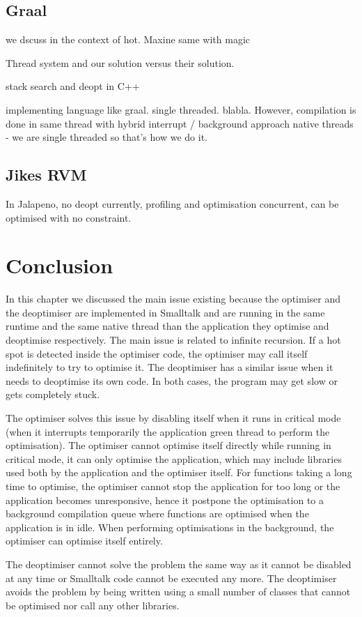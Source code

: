 \documentclass[a4paper,12pt,twoside]{../includes/ThesisStyle}
\begin{document}
\subsection{Graal}

we dscuss in the context of hot. Maxine same with magic

Thread system and our solution versus their solution.

stack search and deopt in C++

implementing language like graal. single threaded. blabla.
However, compilation is done in same thread with hybrid interrupt / background approach
native threads - we are single threaded so that's how we do it.

\subsection{Jikes RVM}

In Jalapeno, no deopt currently, profiling and optimisation concurrent, can be optimised with no constraint. 


\section{Conclusion}

In this chapter we discussed the main issue existing because the optimiser and the deoptimiser are implemented in Smalltalk and are running in the same runtime and the same native thread than the application they optimise and deoptimise respectively. The main issue is related to infinite recursion. If a hot spot is detected inside the optimiser code, the optimiser may call itself indefinitely to try to optimise it. The deoptimiser has a similar issue when it needs to deoptimise its own code. In both cases, the program may get slow or gets completely stuck.

The optimiser solves this issue by disabling itself when it runs in critical mode (when it interrupts temporarily the application green thread to perform the optimisation). The optimiser cannot optimise itself directly while running in critical mode, it can only optimise the  application, which may include libraries used both by the application and the optimiser itself. For functions taking a long time to optimise, the optimiser cannot stop the application for too long or the application becomes unresponsive, hence it postpone the optimisation to a background compilation queue where functions are optimised when the application is in idle. When performing optimisations in the background, the optimiser can optimise itself entirely.

The deoptimiser cannot solve the problem the same way as it cannot be disabled at any time or Smalltalk code cannot be executed any more. The deoptimiser avoids the problem by being written using a small number of classes that cannot be optimised nor call any other libraries.

\ifx\wholebook\relax\else
    
\end{document}
